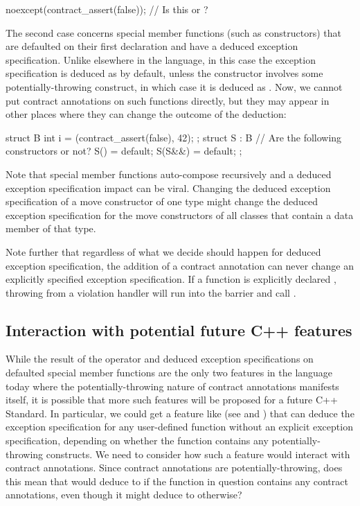 \begin{codeblock}
noexcept(contract_assert(false));   // Is this  or ?
\end{codeblock}

The second case concerns special member functions (such as constructors) that are defaulted on their first declaration and have a deduced exception specification. Unlike elsewhere in the language, in this case the exception specification is deduced as  by default, unless the constructor involves some potentially-throwing construct, in which case it is deduced as . Now, we cannot put contract annotations on such functions directly, but they may appear in other places where they can change the outcome of the deduction:

\begin{codeblock}
struct B {
  int i = (contract_assert(false), 42);
};
struct S : B {
  // Are the following constructors  or not?
  S() = default;
  S(S&&) = default; 
};
\end{codeblock}

Note that special member functions auto-compose recursively and a deduced exception specification impact can be viral. Changing the deduced exception specification of a move constructor of one type might change the deduced exception specification for the move constructors of all classes that contain a data member of that type.

Note further that regardless of what we decide should happen for deduced exception specification, the addition of a contract annotation can never change an explicitly specified exception specification. If a function is explicitly declared , throwing from a violation handler will run into the  barrier and call .

\subsection{Interaction with potential future C++ features}

While the result of the  operator and deduced exception specifications on defaulted special member functions are the only two features in the language today where the potentially-throwing nature of contract annotations manifests itself, it is possible that more such features will be proposed for a future C++ Standard. In particular, we could get a feature like  (see \cite{N4473} and \cite{P0133R0}) that can deduce the exception specification for any user-defined function without an explicit exception specification, depending on whether the function contains any potentially-throwing constructs. We need to consider how such a feature would interact with contract annotations. Since contract annotations are potentially-throwing, does this mean that  would deduce to  if the function in question contains any contract annotations, even though it might deduce to  otherwise?

